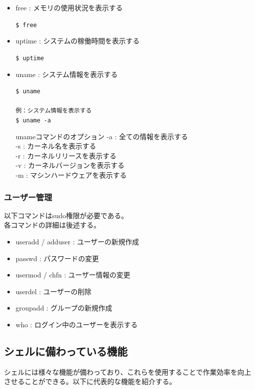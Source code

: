 \documentclass[a4paper, 11pt, dvipdfmx]{jsarticle}
\begin{document}
\begin{itemize}
  \item free : メモリの使用状況を表示する
  \begin{terminalbox}
    \verb|$ free|
  \end{terminalbox}
  \item uptime : システムの稼働時間を表示する
  \begin{terminalbox}
    \verb|$ uptime|
  \end{terminalbox}
  \item uname : システム情報を表示する
  \begin{terminalbox}
    \verb|$ uname|\\\\
    \verb|例：システム情報を表示する|\\
    \verb|$ uname -a|
  \end{terminalbox}
  \begin{hosokubox}{unameコマンドのオプション}
    -a : 全ての情報を表示する\\
    -s : カーネル名を表示する\\
    -r : カーネルリリースを表示する\\
    -v : カーネルバージョンを表示する\\
    -m : マシンハードウェアを表示する
  \end{hosokubox}
\end{itemize}

\subsubsection{ユーザー管理}
以下コマンドはsudo権限が必要である。\\
各コマンドの詳細は後述する。
\begin{itemize}
  \item useradd / adduser : ユーザーの新規作成
  \item passwd : パスワードの変更
  \item usermod / chfn : ユーザー情報の変更
  \item userdel : ユーザーの削除
  \item groupadd : グループの新規作成
  \item who : ログイン中のユーザーを表示する
\end{itemize}

\subsection{シェルに備わっている機能}
シェルには様々な機能が備わっており、これらを使用することで作業効率を向上させることができる。以下に代表的な機能を紹介する。
\end{document}

